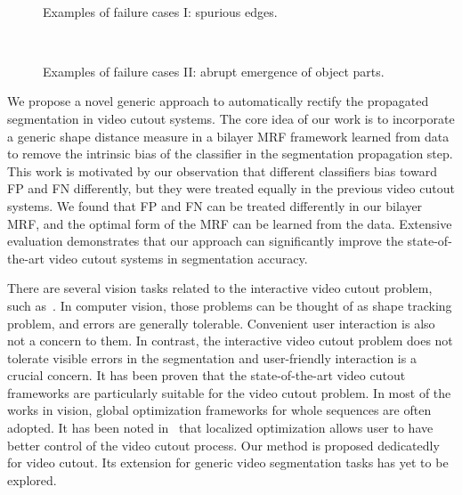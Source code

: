 \documentclass[10pt,journal,compsoc]{newIEEEtran}
\begin{document}
\begin{figure}[!h]
	\centering
	\\\vspace{-2mm}
	\caption{Examples of failure cases I: spurious edges.}\label{FIG:SpuriousEdge}\vspace{-3mm}
	\centering
	\\\vspace{-2mm}
	\caption{Examples of failure cases II: abrupt emergence of object parts.}\label{FIG:SuddenParts}
\end{figure}%
We propose a novel generic approach to automatically rectify the propagated segmentation in video cutout systems. The core idea of our work is to incorporate a generic shape distance measure in a bilayer MRF framework learned from data to remove the intrinsic bias of the classifier in the segmentation propagation step. This work is motivated by our observation that different classifiers bias toward FP and FN differently, but they were treated equally in the previous video cutout systems. We found that FP and FN can be treated differently in our bilayer MRF, and the optimal form of the MRF can be learned from the data. Extensive evaluation demonstrates that our approach can significantly improve the state-of-the-art video cutout systems in segmentation accuracy.

There are several vision tasks related to the interactive video cutout problem, such as~\cite{Xiao2005motionseg,lee2011key,MinglunGong2011VideoSeg,Papazoglou2013fastVseg,chen2013deepshapeprior,Jain2014supervoxelVseg,khoreva2015classifierVseg}. In computer vision, those problems can be thought of as shape tracking problem, and errors are generally tolerable. Convenient user interaction is also not a concern to them. In contrast, the interactive video cutout problem does not tolerate visible errors in the segmentation and user-friendly interaction is a crucial concern. It has been proven that the state-of-the-art video cutout frameworks are particularly suitable for the video cutout problem. In most of the works in vision, global optimization frameworks for whole sequences are often adopted. It has been noted in~\cite{Bai09VideoSnapCut_SIGGRAPH} that localized optimization allows user to have better control of the video cutout process. Our method is proposed dedicatedly for video cutout. Its extension for generic video segmentation tasks has yet to be explored.
\end{document}
